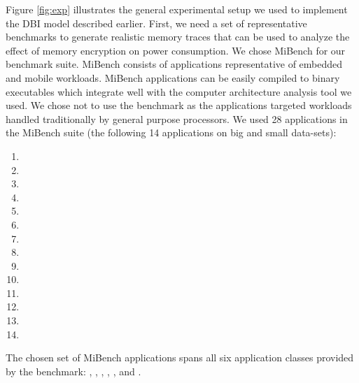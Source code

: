 Figure \ref{fig:exp} illustrates the general experimental setup we used to
implement the DBI model described earlier. First, we need a set of
representative benchmarks to generate realistic memory traces that can be used
to analyze the effect of memory encryption on power consumption. We chose
MiBench \cite{mibench} for our benchmark suite. MiBench consists of
applications representative of embedded and mobile workloads. MiBench
applications can be easily compiled to binary executables which integrate well
with the  computer architecture analysis tool we used. We chose not to
use the  benchmark as the applications targeted workloads handled
traditionally by general purpose processors. We used 28 applications in the
MiBench suite (the following 14 applications on big and small data-sets):
\begin{multicols}{2}
  \centering
  \begin{enumerate}
    \item {}
    \item {}
    \item {}
    \item {}
    \item {}
    \item {}
    \item {}
    \item {}
    \item {}
    \item {}
    \item {}
    \item {}
    \item {}
    \item {}
  \end{enumerate}
\end{multicols}

The chosen set of MiBench applications spans all six application classes
provided by the benchmark: , , ,
, , and .

